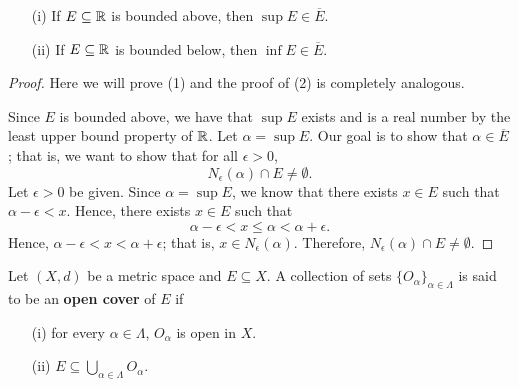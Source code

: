 \documentclass[a4paper]{report}
\begin{document}
\begin{theorem}[ ]
    \begin{enumerate}
        \item[(i)] If \( E \subseteq \mathbb{R}   \) is bounded above, then \( \sup E \in \overline{E} \).
        \item[(ii)] If \( E \subseteq \mathbb{R}  \) is bounded below, then \( \inf E \in \overline{E} \).
    \end{enumerate}
\end{theorem}

\begin{proof}
    Here we will prove (1) and the proof of (2) is completely analogous.

    Since \( E  \) is bounded above, we have that \( \sup E  \) exists and is a real number by the least upper bound property of \( \mathbb{R}  \). Let \( \alpha = \sup E  \). Our goal is to show that \( \alpha \in \overline{E} \); that is, we want to show that for all \( \epsilon > 0  \),
    \[  {N}_{\epsilon}(\alpha) \cap E \neq \emptyset. \tag{Exercise 11 of HW4} \] 
    Let \( \epsilon  > 0  \) be given. Since \( \alpha = \sup E  \), we know that there exists \( x \in E  \) such that \( \alpha - \epsilon < x  \). Hence, there exists \( x \in E  \) such that 
    \[  \alpha - \epsilon <   x \leq \alpha < \alpha + \epsilon. \]
    Hence, \( \alpha - \epsilon < x < \alpha + \epsilon \); that is, \( x \in {N}_{\epsilon}(\alpha) \). Therefore, \( {N}_{\epsilon}(\alpha) \cap E \neq \emptyset \).
\end{proof}

\begin{definition}
    Let \( (X,d) \) be a metric space and \( E \subseteq X  \). A collection of sets \( \{ {O}_{\alpha}   \}_{\alpha \in \Lambda} \) is said to be an \textbf{open cover} of \( E  \) if   
    \begin{enumerate}
        \item[(i)] for every \( \alpha \in \Lambda \), \( {O}_{\alpha}  \) is open in \( X \).
        \item[(ii)] \( E \subseteq \bigcup_{ \alpha \in \Lambda }^{  } {O}_{\alpha} \).
    \end{enumerate}
\end{definition}
\end{document}
